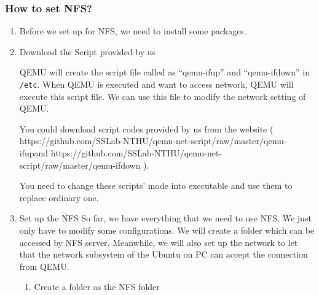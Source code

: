 \documentclass[12pt]{article}  %
\begin{document}
\subsubsection{How to set NFS?}
\begin{enumerate}

\item Before we set up for NFS, we need to install some packages.


\item Download the Script provided by us

QEMU will create the script file called as ``qemu-ifup'' and ``qemu-ifdown'' in \texttt{/etc}. When QEMU is executed and want to access network, QEMU will execute this script file. We can use this file to modify the network setting of QEMU.

You could download script codes provided by us from the website ( \newline https://github.com/SSLab-NTHU/qemu-net-script/raw/master/qemu-ifup\newline and https://github.com/SSLab-NTHU/qemu-net-script/raw/master/qemu-ifdown ).




You need to change these scripts' mode into executable and use them to replace ordinary one.





\item Set up the NFS
So far, we have everything that we need to use NFS. We just only have to modify some configurations. We will create a folder which can be accessed by NFS server. Meanwhile, we will also set up the network to let that the network subsystem of the Ubuntu on PC can accept the connection from QEMU.

\begin{enumerate}
\item Create a folder as the NFS folder


\end{enumerate}
\end{enumerate}
\end{document}
